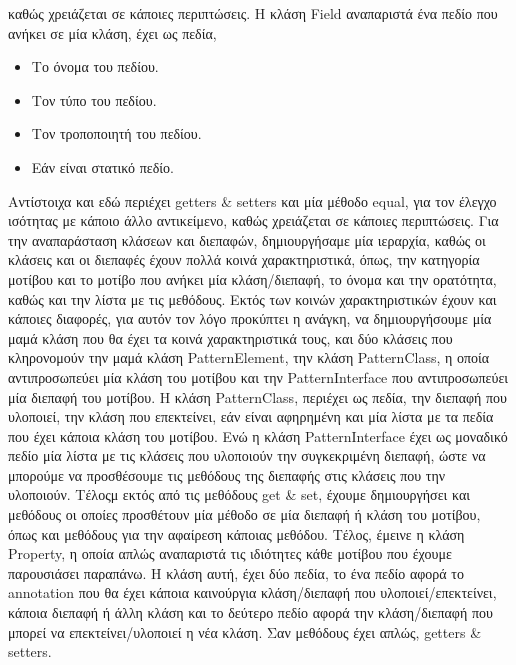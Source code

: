 καθώς χρειάζεται σε κάποιες περιπτώσεις.
\newline
Η κλάση Field αναπαριστά ένα πεδίο που ανήκει σε μία κλάση, έχει ως πεδία,
\begin{itemize}
    \item Το όνομα του πεδίου.
    \item Τον τύπο του πεδίου.
    \item Τον τροποποιητή του πεδίου.
    \item Εάν είναι στατικό πεδίο.
\end{itemize}
Αντίστοιχα και εδώ περιέχει getters \& setters και μία μέθοδο equal, για τον έλεγχο ισότητας με κάποιο άλλο αντικείμενο, 
καθώς χρειάζεται σε κάποιες περιπτώσεις.
\newline
Για την αναπαράσταση κλάσεων και διεπαφών, δημιουργήσαμε μία ιεραρχία, καθώς οι κλάσεις και οι διεπαφές 
έχουν πολλά κοινά χαρακτηριστικά, όπως, την κατηγορία μοτίβου και το μοτίβο που ανήκει μία κλάση/διεπαφή, το όνομα και την ορατότητα, 
καθώς και την λίστα με τις μεθόδους. Εκτός των κοινών χαρακτηριστικών έχουν και κάποιες διαφορές, για αυτόν τον λόγο προκύπτει η ανάγκη, 
να δημιουργήσουμε μία μαμά κλάση που θα έχει τα κοινά χαρακτηριστικά τους, και δύο κλάσεις που κληρονομούν την μαμά κλάση PatternElement, 
την κλάση PatternClass, η οποία αντιπροσωπεύει μία κλάση του μοτίβου και την PatternInterface που αντιπροσωπεύει μία διεπαφή του μοτίβου. 
Η κλάση PatternClass, περιέχει ως πεδία, την διεπαφή που υλοποιεί, την κλάση που επεκτείνει, εάν είναι αφηρημένη και 
μία λίστα με τα πεδία που έχει κάποια κλάση του μοτίβου. Ενώ η κλάση PatternInterface έχει ως μοναδικό 
πεδίο μία λίστα με τις κλάσεις που υλοποιούν την συγκεκριμένη διεπαφή, ώστε να μπορούμε να προσθέσουμε τις μεθόδους της 
διεπαφής στις κλάσεις που την υλοποιούν. Τέλοςμ εκτός από τις μεθόδους get \& set, έχουμε δημιουργήσει και μεθόδους 
οι οποίες προσθέτουν μία μέθοδο σε μία διεπαφή ή κλάση του μοτίβου, όπως και μεθόδους για την αφαίρεση κάποιας μεθόδου.
\newline
Τέλος, έμεινε η κλάση Property, η οποία απλώς αναπαριστά τις ιδιότητες κάθε μοτίβου που έχουμε παρουσιάσει παραπάνω. Η κλάση αυτή, 
έχει δύο πεδία, το ένα πεδίο αφορά το annotation που θα έχει κάποια καινούργια κλάση/διεπαφή που υλοποιεί/επεκτείνει, 
κάποια διεπαφή ή άλλη κλάση και το δεύτερο πεδίο αφορά την κλάση/διεπαφή που μπορεί να επεκτείνει/υλοποιεί η  νέα κλάση. Σαν μεθόδους έχει απλώς, 
getters \& setters.
